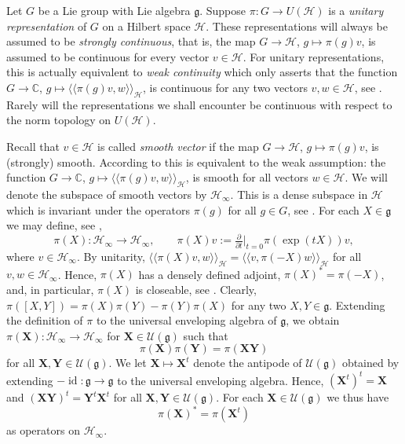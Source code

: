 \documentclass[reqno,12pt]{amsart}
\newcommand\goe{\mathfrak g}
\newcommand\llangle{\langle\!\langle}
\newcommand\rrangle{\rangle\!\rangle}
\DeclareMathOperator{\id}{id}
\newcommand\C{\mathbb C}
\theoremstyle{plain}
\theoremstyle{definition}
\begin{document}
Let $G$ be a Lie group with Lie algebra $\goe$. 
Suppose $\pi\colon G\to U(\mathcal H)$ is a \emph{unitary representation} of $G$ on a Hilbert space $\mathcal H$.
These representations will always be assumed to be \emph{strongly continuous}, that is, the map $G\to\mathcal H$, $g\mapsto\pi(g)v$, is assumed to be continuous for every vector $v\in\mathcal H$.
For unitary representations, this is actually equivalent to \emph{weak continuity} which only asserts that the function $G\to\C$, $g\mapsto\llangle\pi(g)v,w\rrangle_{\mathcal H}$, is continuous for any two vectors $v,w\in\mathcal H$, see \cite[Theorem~1 in Appendix~V]{K04}.
Rarely will the representations we shall encounter be continuous with respect to the norm topology on $U(\mathcal H)$.


Recall that $v\in\mathcal H$ is called \emph{smooth vector} if the map $G\to\mathcal H$, $g\mapsto\pi(g)v$, is (strongly) smooth.
According to \cite[Theorem~3 in Appendix~V]{K04} this is equivalent to the weak assumption: the function $G\to\C$, $g\mapsto\llangle\pi(g)v,w\rrangle_{\mathcal H}$, is smooth for all vectors $w\in\mathcal H$.
We will denote the subspace of smooth vectors by $\mathcal H_\infty$.
This is a dense subspace in $\mathcal H$ which is invariant under the operators $\pi(g)$ for all $g\in G$, see \cite[Theorem~4(1) in Appendix~V]{K04}.
For each $X\in\goe$ we may define, see \cite[Theorem~4(2) in Appendix~V]{K04}, 
$$
\pi(X)\colon\mathcal H_\infty\to\mathcal H_\infty,\qquad\pi(X)v:=\tfrac\partial{\partial t}\big|_{t=0}\pi(\exp(tX))v,
$$
where $v\in\mathcal H_\infty$.
By unitarity, $\llangle\pi(X)v,w\rrangle_{\mathcal H}=\llangle v,\pi(-X)w\rrangle_{\mathcal H}$ for all $v,w\in\mathcal H_\infty$.
Hence, $\pi(X)$ has a densely defined adjoint, $\pi(X)^*=\pi(-X)$, and, in particular, $\pi(X)$ is closeable, see \cite[Theorem~4(2) in Appendix~V]{K04}.
Clearly, $\pi([X,Y])=\pi(X)\pi(Y)-\pi(Y)\pi(X)$ for any two $X,Y\in\goe$.
Extending the definition of $\pi$ to the universal enveloping algebra of $\goe$, we obtain $\pi(\mathbf X)\colon\mathcal H_\infty\to\mathcal H_\infty$ for $\mathbf X\in\mathcal U(\goe)$ such that 
\begin{equation}\label{E:piXY}
\pi(\mathbf X)\pi(\mathbf Y)=\pi(\mathbf X\mathbf Y)
\end{equation}
for all $\mathbf X,\mathbf Y\in\mathcal U(\goe)$.
We let $\mathbf X\mapsto\mathbf X^t$ denote the antipode of $\mathcal U(\goe)$ obtained by extending $-\id\colon\goe\to\goe$ to the universal enveloping algebra.
Hence, $(\mathbf X^t)^t=\mathbf X$ and $(\mathbf X\mathbf Y)^t=\mathbf Y^t\mathbf X^t$ for all $\mathbf X,\mathbf Y\in\mathcal U(\goe)$.
For each $\mathbf X\in\mathcal U(\goe)$ we thus have 
\begin{equation}\label{E:piX*}
\pi(\mathbf X)^*=\pi(\mathbf X^t)
\end{equation} 
as operators on $\mathcal H_\infty$.
\end{document}

